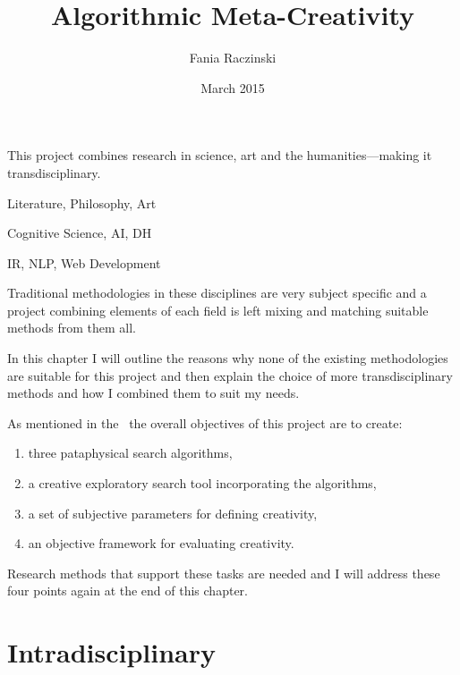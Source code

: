 \documentclass[11pt]{thesis} %
\title{Algorithmic Meta-Creativity}
\author{Fania Raczinski}
\date{March 2015}
\begin{document}


This project combines research in science, art and the humanities---making it transdisciplinary.

\begin{description}[leftmargin=3cm]
  \item [Pataphysics] Literature, Philosophy, Art
  \item [Creativity] Cognitive Science, \ac{AI}, \ac{DH}
  \item [Technology] \ac{IR}, \ac{NLP}, Web Development
\end{description}

Traditional methodologies in these disciplines are very subject specific and a project combining elements of each field is left mixing and matching suitable methods from them all.

In this chapter I will outline the reasons why none of the existing methodologies are suitable for this project and then explain the choice of more transdisciplinary methods and how I combined them to suit my needs.


As mentioned in the~ the overall objectives of this project are to create:

\label{s:objectives}
\begin{enumerate}
  \item three pataphysical search algorithms,
  \item a creative exploratory search tool incorporating the algorithms,
  \item a set of subjective parameters for defining creativity,
  \item an objective framework for evaluating creativity.
\end{enumerate}

Research methods that support these tasks are needed and I will address these four points again at the end of this chapter.


\section{Intradisciplinary}
\end{document}
